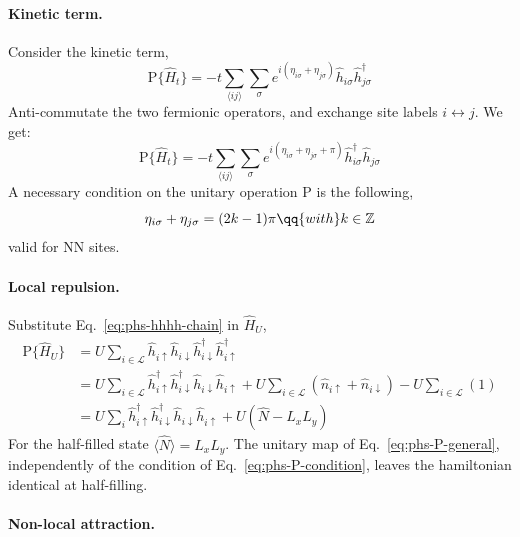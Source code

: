 \paragraph{Kinetic term.}

Consider the kinetic term,
\[
	\mathrm{P} \lbrace \hat H_t \rbrace = -t \sum_{\langle ij \rangle} \sum_\sigma e^{i(\eta_{i\sigma} + \eta_{j\sigma})} \hat h_{i\sigma} \hat h_{j\sigma}^\dagger
\]
Anti-commutate the two fermionic operators, and exchange site labels $i \leftrightarrow j$. We get:
\[
	\mathrm{P} \lbrace \hat H_t \rbrace = -t \sum_{\langle ij \rangle} \sum_\sigma e^{i(\eta_{i\sigma} + \eta_{j\sigma}+\pi)} \hat h_{i\sigma}^\dagger \hat h_{j\sigma}
\]
A necessary condition on the unitary operation $\mathrm{P}$ is the following,
\begin{equation}\label{eq:phs-P-condition}
	\eta_{i\sigma} + \eta_{j\sigma} = (2k-1)\pi
	\qq{with}
	k\in\mathbb{Z}
\end{equation}
valid for NN sites.

\paragraph{Local repulsion.}

Substitute Eq.~\eqref{eq:phs-hhhh-chain} in $\hat H_U$,
\[
\begin{aligned}
	\mathrm{P} \lbrace \hat H_U \rbrace &= U \sum_{i\in\mathcal{L}} \hat h_{i\uparrow} \hat h_{i\downarrow} \hat h_{i\downarrow}^\dagger \hat h_{i\uparrow}^\dagger \\
	&= U \sum_{i\in\mathcal{L}} \hat h_{i\uparrow}^\dagger \hat h_{i\downarrow}^\dagger \hat h_{i\downarrow}\hat h_{i\uparrow} + U \sum_{i\in\mathcal{L}} \left(
		\hat n_{i\uparrow} + \hat n_{i\downarrow}
	\right) - U \sum_{i\in\mathcal{L}} (1) \\
	&= U \sum_i \hat h_{i\uparrow}^\dagger \hat h_{i\downarrow}^\dagger \hat h_{i\downarrow}\hat h_{i\uparrow} + U (\hat N - L_x L_y)
\end{aligned}
\]
For the half-filled state $\langle \hat N \rangle = L_x L_y$. The unitary map of Eq.~\eqref{eq:phs-P-general}, independently of the condition of Eq.~\eqref{eq:phs-P-condition}, leaves the hamiltonian identical at half-filling.

\paragraph{Non-local attraction.}

